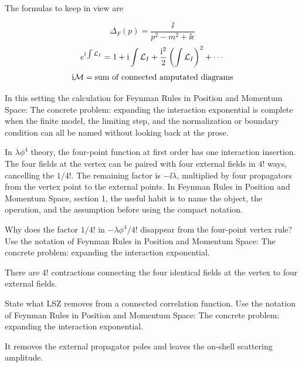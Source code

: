 The formulas to keep in view are

\[
  \Delta_F(p)=\frac{\ii}{p^2-m^2+\ii\epsilon}
\]
\[
  e^{\mathrm i\int\mathcal L_I}=1+\mathrm i\int\mathcal L_I+\frac{\mathrm i^2}{2}\left(\int\mathcal L_I\right)^2+\cdots
\]
\[
  \mathrm i\mathcal M=\hbox{sum of connected amputated diagrams}
\]

In this setting the calculation for Feynman Rules in Position and Momentum Space: The concrete problem: expanding the interaction exponential is complete when the finite model, the limiting step, and the normalization or boundary condition can all be named without looking back at the prose.




\begin{example}
In \(\lambda\phi^4\) theory, the four-point function at first order has one interaction insertion.  The four fields at the vertex can be paired with four external fields in \(4!\) ways, cancelling the \(1/4!\).  The remaining factor is \(-\ii\lambda\), multiplied by four propagators from the vertex point to the external points.  In Feynman Rules in Position and Momentum Space, section 1, the useful habit is to name the object, the operation, and the assumption before using the compact notation.
\end{example}



\begin{exercise}
Why does the factor \(1/4!\) in \(-\lambda\phi^4/4!\) disappear from the four-point vertex rule?  Use the notation of Feynman Rules in Position and Momentum Space: The concrete problem: expanding the interaction exponential.
\begin{answer}
There are \(4!\) contractions connecting the four identical fields at the vertex to four external fields.
\end{answer}
\end{exercise}

\begin{exercise}
State what LSZ removes from a connected correlation function.  Use the notation of Feynman Rules in Position and Momentum Space: The concrete problem: expanding the interaction exponential.
\begin{answer}
It removes the external propagator poles and leaves the on-shell scattering amplitude.
\end{answer}
\end{exercise}



